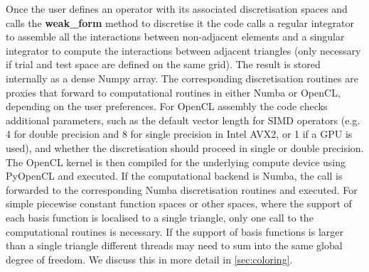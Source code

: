 Once the user defines an operator with its associated discretisation spaces and calls the \textbf{weak\_form} method to discretise it the code calls a regular integrator to assemble all the interactions between non-adjacent elements and a singular integrator to compute the interactions between adjacent triangles (only necessary if trial and test space are defined on the same grid). The result is stored internally as a dense Numpy array. The corresponding discretisation routines are proxies that forward to computational routines in either Numba or OpenCL, depending on the user preferences. For OpenCL assembly the code checks additional parameters, such as the default vector length for SIMD operators (e.g. 4 for double precision and 8 for single precision in Intel AVX2, or 1 if a GPU is used), and whether the discretisation should proceed in single or double precision. The OpenCL kernel is then compiled for the underlying compute device using PyOpenCL and executed. If the computational backend is Numba, the call is forwarded to the corresponding Numba discretisation routines and executed. For simple piecewise constant function spaces or other spaces, where the support of each basis function is localised to a single triangle, only one call to the computational routines is necessary. If the support of basis functions is larger than a single triangle different threads may need to sum into the same global degree of freedom. We discuss this in more detail in \cref{sec:coloring}.

